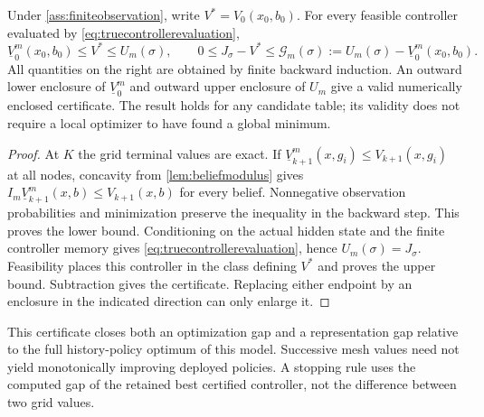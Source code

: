 \begin{theorem}
\label{thm:computablepartial}
Under \cref{ass:finiteobservation}, write $V^*=V_0(x_0,b_0)$. For every
feasible controller evaluated by \eqref{eq:truecontrollerevaluation},
\begin{equation}\label{eq:computablegap}
 \underline V_0^m(x_0,b_0)\le V^*\le U_m(\sigma),\qquad
 0\le J_\sigma-V^*\le
 \mathcal G_m(\sigma):=U_m(\sigma)-\underline V_0^m(x_0,b_0).
\end{equation}
All quantities on the right are obtained by finite backward induction.
An outward lower enclosure of $\underline V_0^m$ and outward upper enclosure
of $U_m$ give a valid numerically enclosed certificate. The result holds
for any candidate table; its validity does not require a local optimizer
to have found a global minimum.
\end{theorem}
\begin{proof}
At $K$ the grid terminal values are exact. If
$\underline V_{k+1}^m(x,g_i)\le V_{k+1}(x,g_i)$ at all nodes, concavity
from \cref{lem:beliefmodulus} gives
$I_m\underline V_{k+1}^m(x,b)\le V_{k+1}(x,b)$ for every belief.
Nonnegative observation probabilities and minimization preserve the inequality
in the backward step. This proves the lower bound. Conditioning on the
actual hidden state and the finite controller memory gives
\eqref{eq:truecontrollerevaluation}, hence $U_m(\sigma)=J_\sigma$.
Feasibility places this controller in the class defining $V^*$ and proves
the upper bound. Subtraction gives the certificate. Replacing either endpoint
by an enclosure in the indicated direction can only enlarge it.
\end{proof}

This certificate closes both an optimization gap and a representation gap
relative to the full history-policy optimum of this model. Successive mesh
values need not yield monotonically improving deployed policies. A stopping
rule uses the computed gap of the retained best certified controller, not
the difference between two grid values.

